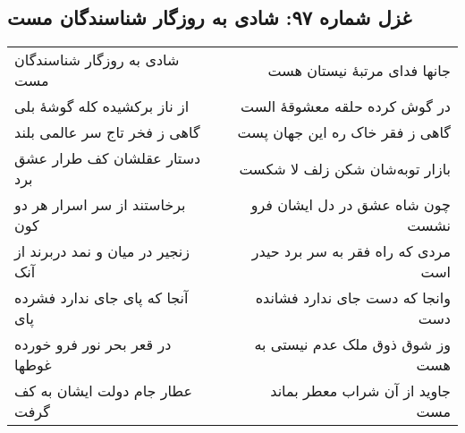 \begin{center}
\section*{غزل شماره ۹۷: شادی به روزگار شناسندگان مست}
\label{sec:097}
\begin{longtable}{l p{0.5cm} r}
شادی به روزگار شناسندگان مست
&&
جانها فدای مرتبهٔ نیستان هست
\\
از ناز برکشیده کله گوشهٔ بلی
&&
در گوش کرده حلقه معشوقهٔ الست
\\
گاهی ز فخر تاج سر عالمی بلند
&&
گاهی ز فقر خاک ره این جهان پست
\\
دستار عقلشان کف طرار عشق برد
&&
بازار توبه‌شان شکن زلف لا شکست
\\
برخاستند از سر اسرار هر دو کون
&&
چون شاه عشق در دل ایشان فرو نشست
\\
زنجیر در میان و نمد دربرند از آنک
&&
مردی که راه فقر به سر برد حیدر است
\\
آنجا که پای جای ندارد فشرده پای
&&
وانجا که دست جای ندارد فشانده دست
\\
در قعر بحر نور فرو خورده غوطها
&&
وز شوق ذوق ملک عدم نیستی به هست
\\
عطار جام دولت ایشان به کف گرفت
&&
جاوید از آن شراب معطر بماند مست
\\
\end{longtable}
\end{center}
